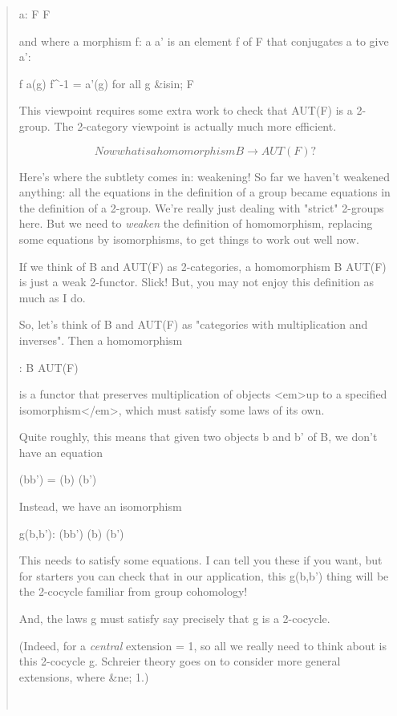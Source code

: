 \begin{quote}
a: F \to  F

and where a morphism f: a \to  a' is an element f of F that conjugates 
a to give a':

f a(g) f^{-1} = a'(g)   for all g &isin; F

This viewpoint requires some extra work to check that AUT(F) is a 
2-group.  The 2-category viewpoint is actually much more efficient.


$$

  Now what is a homomorphism B \to  AUT(F)?
$$
    

Here's where the subtlety comes in: weakening!  So far we haven't
weakened anything: all the equations in the definition of a group
became equations in the definition of a 2-group.  We're really just
dealing with "strict" 2-groups here.  
But we need to \emph{weaken} the
definition of homomorphism, replacing some equations by isomorphisms,
to get things to work out well now.

If we think of B and AUT(F) as 2-categories, a homomorphism B \to  AUT(F)
is just a weak 2-functor.  Slick!  But, you may not enjoy this definition 
as much as I do.

So, let's think of B and AUT(F) as "categories with multiplication and
inverses".  Then a homomorphism 

\alpha : B \to  AUT(F) 

is a functor that preserves multiplication of objects <em>up to a 
specified isomorphism</em>, which must satisfy some laws of its own.  

Quite roughly, this means that given two objects b and b' of B,
we don't have an equation

\alpha (bb') = \alpha (b) \alpha (b')

Instead, we have an isomorphism

g(b,b'): \alpha (bb') \to  \alpha (b) \alpha (b')   

This needs to satisfy some equations.  I can tell you these if you
want, but for starters you can check that in our application, this 
g(b,b') thing will be the 2-cocycle familiar from group cohomology!

And, the laws g must satisfy say precisely that g is a 2-cocycle.

(Indeed, for a \emph{central} extension \alpha  = 1, so all we really need
to think about is this 2-cocycle g.  Schreier theory goes on to consider 
more general extensions, where \alpha  &ne; 1.)


\begin{verbatim}


\end{verbatim}
\end{quote}
